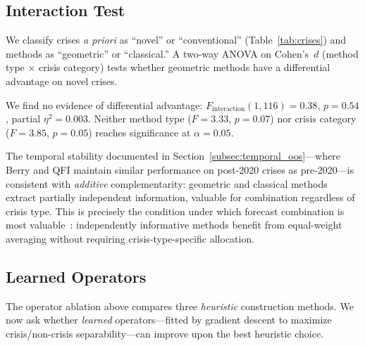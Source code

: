 
\subsection{Interaction Test}\label{subsec:interaction}

We classify crises \emph{a priori} as ``novel'' or ``conventional''
(Table~\ref{tab:crises}) and methods as ``geometric'' or
``classical.''  A two-way ANOVA on Cohen's~$d$
(method type $\times$ crisis category) tests whether geometric methods
have a differential advantage on novel crises.

We find no evidence of differential advantage:
$F_{\mathrm{interaction}}(1,116) = 0.38$, $p = 0.54$, partial
$\eta^2 = 0.003$.  Neither method type ($F = 3.33$, $p = 0.07$)
nor crisis category ($F = 3.85$, $p = 0.05$) reaches significance
at $\alpha = 0.05$.

The temporal stability documented in
Section~\ref{subsec:temporal_oos}---where Berry and QFI maintain
similar performance on post-2020 crises as pre-2020---is consistent
with \emph{additive} complementarity: geometric and classical methods
extract partially independent information, valuable for combination
regardless of crisis type.  This is precisely the condition under
which forecast combination is most
valuable~\cite{bates_granger1969}: independently informative
methods benefit from equal-weight averaging without requiring
crisis-type-specific allocation.



\subsection{Learned Operators}\label{subsec:learned_operators}

The operator ablation above compares three \emph{heuristic}
construction methods.  We now ask whether \emph{learned} operators---fitted
by gradient descent to maximize crisis/non-crisis separability---can
improve upon the best heuristic choice.

